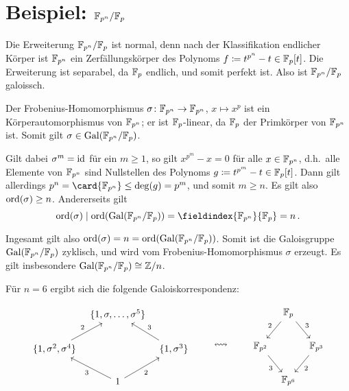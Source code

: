 \section{Beispiel: \texorpdfstring{$\mathbb{F}_{p^n}/\mathbb{F}_p$}{F\_(pn)/F\_p}}

Die Erweiterung $\mathbb{F}_{p^n}/\mathbb{F}_p$ ist normal, denn nach der Klassifikation endlicher Körper ist $\mathbb{F}_{p^n}$ ein Zerfällungskörper des Polynoms $f \coloneqq t^{p^n} - t \in \mathbb{F}_p[t]$.
Die Erweiterung ist separabel, da $\mathbb{F}_p$ endlich, und somit perfekt ist.
Also ist $\mathbb{F}_{p^n}/\mathbb{F}_p$ galoissch.

Der Frobenius-Homomorphismus $\sigma \colon \mathbb{F}_{p^n} \to \mathbb{F}_{p^n}$, $x \mapsto x^p$ ist ein Körperautomorphismus von $\mathbb{F}_{p^n}$;
er ist $\mathbb{F}_p$-linear, da $\mathbb{F}_p$ der Primkörper von $\mathbb{F}_{p^n}$ ist.
Somit gilt $\sigma \in \operatorname{Gal}(\mathbb{F}_{p^n}/\mathbb{F}_p)$.

Gilt dabei $\sigma^m = \operatorname{id}$ für ein $m \geq 1$, so gilt $x^{p^m} - x = 0$ für alle $x \in \mathbb{F}_{p^n}$, d.h.\ alle Elemente von $\mathbb{F}_{p^n}$ sind Nullstellen des Polynoms $g \coloneqq t^{p^m} - t \in \mathbb{F}_p[t]$.
Dann gilt allerdings $p^n = \card{\Finite_{p^n}} \leq \deg(g) = p^m$, und somit $m \geq n$.
Es gilt also $\operatorname{ord}(\sigma) \geq n$.
Andererseits gilt
\[
            \ord{\sigma}
  \divides  \ord{ \Gal{\Finite_{p^n}/\Finite_p} }
  =         \fieldindex{\Finite_{p^n}}{\Finite_p}
  =         n \,.
\]

Ingesamt gilt also $\operatorname{ord}(\sigma) = n = \operatorname{ord}( \operatorname{Gal}(\mathbb{F}_{p^n}/\mathbb{F}_p) )$.
Somit ist die Galoisgruppe $\operatorname{Gal}(\mathbb{F}_{p^n}/\mathbb{F}_p)$ zyklisch, und wird vom Frobenius-Homomorphismus $\sigma$ erzeugt.
Es gilt insbesondere $\operatorname{Gal}(\mathbb{F}_{p^n}/\mathbb{F}_p) \cong \mathbb{Z}/n$.

Für $n = 6$ ergibt sich die folgende Galoiskorrespondenz:

\[
  \begin{tikzcd}[column sep = tiny]
      {}
    & \{1, \sigma, \dotsc, \sigma^5\}
    & {}
    \\
      \{1, \sigma^2, \sigma^4\}
      \arrow{ur}[above left]{2}
    & {}
    & \{1, \sigma^3\}
      \arrow{ul}[above right]{3}
    \\
      {}
    & 1
      \arrow{lu}[below left]{3}
      \arrow{ru}[below right]{2}
    & {}
  \end{tikzcd}
  \qquad\leftrightsquigarrow\qquad
  \begin{tikzcd}[column sep = tiny]
      {}
    & \Finite_p
      \arrow{dl}[above left]{2}
      \arrow{dr}[above right]{3}
    & {}
    \\
      \Finite_{p^2}
      \arrow{dr}[below left]{3}
    & {}
    & \Finite_{p^3}
      \arrow{dl}[below right]{2}
    \\
      {}
    & \Finite_{p^6}
    & {}
  \end{tikzcd}
\]





